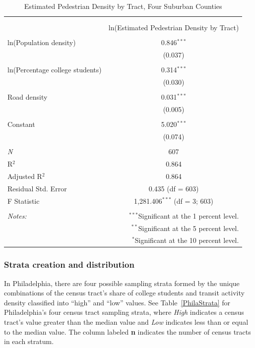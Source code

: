 \documentclass[paper=letterpaper, fontsize=11pt]{scrartcl}
\begin{document}
\FloatBarrier
\begin{table}[!htbp] \centering 
	\caption{Estimated Pedestrian Density by Tract, Four Suburban Counties} 
	\label{} 
	\begin{tabular}{@{\extracolsep{5pt}}lc} 
		\\[-1.8ex]\hline 
		\hline \\[-1.8ex] 
		\\[-1.8ex] & ln(Estimated Pedestrian Density by Tract) \\ 
		\hline \\[-1.8ex] 
		ln(Population density) & 0.846$^{***}$ \\ 
		& (0.037) \\ 
		& \\ 
		ln(Percentage college students) & 0.314$^{***}$ \\ 
		& (0.030) \\ 
		& \\ 
		Road density & 0.031$^{***}$ \\ 
		& (0.005) \\ 
		& \\ 
		Constant & 5.020$^{***}$ \\ 
		& (0.074) \\ 
		& \\ 
		\textit{N} & 607 \\ 
		R$^{2}$ & 0.864 \\ 
		Adjusted R$^{2}$ & 0.864 \\ 
		Residual Std. Error & 0.435 (df = 603) \\ 
		F Statistic & 1,281.406$^{***}$ (df = 3; 603) \\ 
		\hline 
		\hline \\[-1.8ex] 
		\textit{Notes:} & \multicolumn{1}{r}{$^{***}$Significant at the 1 percent level.} \\ 
		& \multicolumn{1}{r}{$^{**}$Significant at the 5 percent level.} \\ 
		& \multicolumn{1}{r}{$^{*}$Significant at the 10 percent level.} \\ 
	\end{tabular} 
\end{table} 
\FloatBarrier

\subsubsection{Strata creation and distribution}
In Philadelphia, there are four possible sampling strata formed by the unique combinations of the census tract's share of college students and transit activity density classified into ``high'' and ``low'' values. See Table~\ref{PhilaStrata} for Philadelphia's four census tract sampling strata, where \textit{High} indicates a census tract's value greater than the median value and \textit{Low} indicates less than or equal to the median value. The column labeled \textbf{n} indicates the number of census tracts in each stratum.
\end{document}
